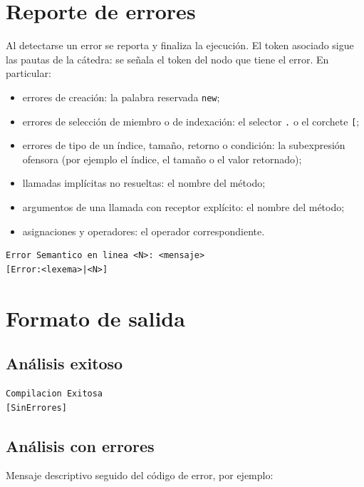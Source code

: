 \documentclass[11pt,a4paper]{article}
\begin{document}
\section{Reporte de errores}

Al detectarse un error se reporta y finaliza la ejecución. El token asociado sigue
las pautas de la cátedra: se señala el token del nodo que tiene el error. En
particular:

\begin{itemize}
  \item errores de creación: la palabra reservada \texttt{new};
  \item errores de selección de miembro o de indexación: el selector \texttt{.} o
        el corchete \texttt{[};
  \item errores de tipo de un índice, tamaño, retorno o condición: la
        subexpresión ofensora (por ejemplo el índice, el tamaño o el valor
        retornado);
  \item llamadas implícitas no resueltas: el nombre del método;
  \item argumentos de una llamada con receptor explícito: el nombre del método;
  \item asignaciones y operadores: el operador correspondiente.
\end{itemize}

{\footnotesize
\begin{verbatim}
Error Semantico en linea <N>: <mensaje>
[Error:<lexema>|<N>]
\end{verbatim}
}

\section{Formato de salida}

\subsection{Análisis exitoso}

{\footnotesize
\begin{verbatim}
Compilacion Exitosa
[SinErrores]
\end{verbatim}
}

\subsection{Análisis con errores}

Mensaje descriptivo seguido del código de error, por ejemplo:
\end{document}

